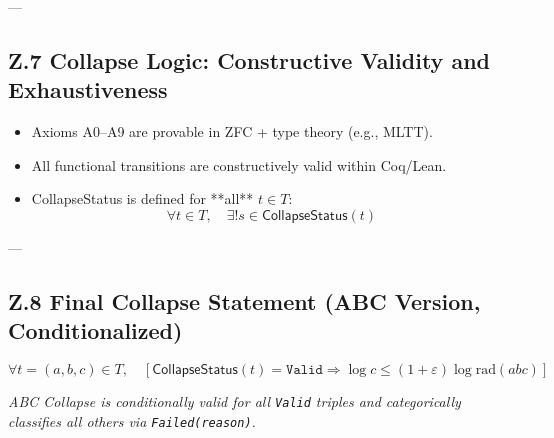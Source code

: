\documentclass[11pt]{article}
\begin{document}
---

\subsection*{Z.7 Collapse Logic: Constructive Validity and Exhaustiveness}

\begin{itemize}
  \item Axioms A0–A9 are provable in ZFC + type theory (e.g., MLTT).
  \item All functional transitions are constructively valid within Coq/Lean.
  \item CollapseStatus is defined for **all** \( t \in T \):  
  \[
  \forall t \in T,\quad \exists! s \in \mathsf{CollapseStatus}(t)
  \]
\end{itemize}

---

\subsection*{Z.8 Final Collapse Statement (ABC Version, Conditionalized)}

\[
\forall t = (a,b,c) \in T,\quad
\left[
  \mathsf{CollapseStatus}(t) = \texttt{Valid}
  \Rightarrow
  \log c \leq (1+\varepsilon)\log \mathrm{rad}(abc)
\right]
\]

\begin{center}
\textit{ABC Collapse is conditionally valid for all \texttt{Valid} triples and categorically classifies all others via \texttt{Failed(reason)}.}
\end{center}
\end{document}
